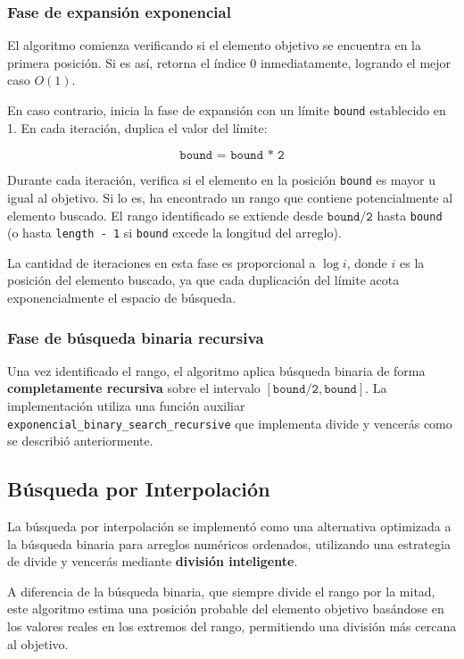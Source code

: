 \subsubsection{Fase de expansión exponencial}

El algoritmo comienza verificando si el elemento objetivo se encuentra en la primera posición. Si es así, retorna el índice 0 inmediatamente, logrando el mejor caso \(O(1)\).

En caso contrario, inicia la fase de expansión con un límite \texttt{bound} establecido en 1. En cada iteración, duplica el valor del límite:

\[
\texttt{bound = bound * 2}
\]

Durante cada iteración, verifica si el elemento en la posición \texttt{bound} es mayor u igual al objetivo. Si lo es, ha encontrado un rango que contiene potencialmente al elemento buscado. El rango identificado se extiende desde \(\texttt{bound/2}\) hasta \texttt{bound} (o hasta \texttt{length - 1} si \texttt{bound} excede la longitud del arreglo).

La cantidad de iteraciones en esta fase es proporcional a \(\log i\), donde \(i\) es la posición del elemento buscado, ya que cada duplicación del límite acota exponencialmente el espacio de búsqueda.

\subsubsection{Fase de búsqueda binaria recursiva}

Una vez identificado el rango, el algoritmo aplica búsqueda binaria de forma \textbf{completamente recursiva} sobre el intervalo \([\texttt{bound/2}, \texttt{bound}]\). La implementación utiliza una función auxiliar \texttt{exponencial\_binary\_search\_recursive} que implementa divide y vencerás como se describió anteriormente.

\subsection{Búsqueda por Interpolación}

La búsqueda por interpolación se implementó como una alternativa optimizada a la búsqueda binaria para arreglos numéricos ordenados, utilizando una estrategia de divide y vencerás mediante \textbf{división inteligente}.

A diferencia de la búsqueda binaria, que siempre divide el rango por la mitad, este algoritmo estima una posición probable del elemento objetivo basándose en los valores reales en los extremos del rango, permitiendo una división más cercana al objetivo.

